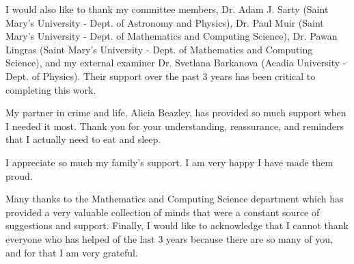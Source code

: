I would also like to thank my committee members, Dr. Adam J. Sarty (Saint Mary's University - Dept. of Astronomy and Physics), Dr. Paul Muir (Saint Mary's University - Dept. of Mathematics and Computing Science), Dr. Pawan Lingras (Saint Mary's University - Dept. of Mathematics and Computing Science), and my external examiner Dr. Svetlana Barkanova (Acadia University - Dept. of Physics).
Their support over the past 3 years has been critical to completing this work.

My partner in crime and life, Alicia Beazley, has provided so much support when I needed it most.
Thank you for your understanding, reassurance, and reminders that I actually need to eat and sleep.

I appreciate so much my family's support.
I am very happy I have made them proud.

Many thanks to the Mathematics and Computing Science department which has provided a very valuable collection of minds that were a constant source of suggestions and support.
Finally, I would like to acknowledge that I cannot thank everyone who has helped of the last 3 years because there are so many of you, and for that I am very grateful.

\clearpage
{} %
\setcounter{page}{1}

